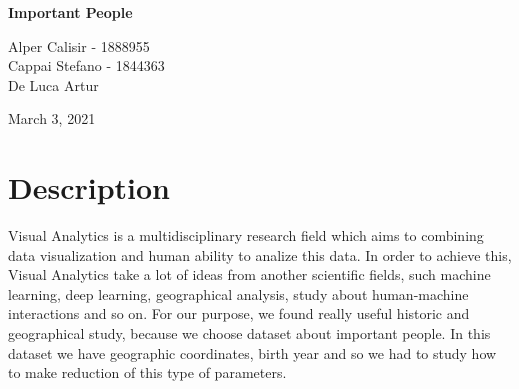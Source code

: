 \documentclass[12pt]{article}
\begin{document}
\begin{center}
\vspace*{5cm}
{\Huge
\bfseries{
	Important People
	}
  }
  \vspace*{3cm}
{\LARGE
  	
  	Alper Calisir - 1888955\\
	Cappai Stefano - 1844363\\
	De Luca Artur
	
	\vspace*{1cm}
	March 3, 2021
}
\end{center}

\pagebreak

\tableofcontents

\pagebreak

\section{Description}
Visual Analytics is a multidisciplinary research field which aims to combining data visualization and human ability to analize this data.
In order to achieve this, Visual Analytics take a lot of ideas from another scientific fields, such machine learning, deep learning, geographical analysis, study about human-machine interactions and so on.
For our purpose, we found really useful historic and geographical study, because we choose dataset about important people. In this dataset we have geographic coordinates, birth year and so we had to study how to make reduction of this type of parameters.
\end{document}
